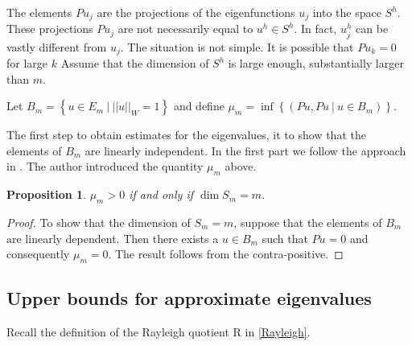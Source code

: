 \documentclass[../../main.tex]{subfiles}
\begin{document}
The elements $Pu_j$ are the projections of the eigenfunctions $u_j$ into the space $S^h$. These projections $Pu_j$ are not necessarily equal to $u^h \in S^h$. In fact, $u^h_j$  can be vastly different from $u_j$. The situation is not simple. It is possible that $Pu_k = 0$ for large $k$ Assume that the dimension of $S^h$ is large enough, substantially larger than $m$.

Let $B_m = \left\{u \in E_m \ | \ ||u||_{W} = 1 \right\}$ and define $\mu_m = \inf\left\{(Pu,Pu \ | \ u \in B_m)\right\}$.

The first step to obtain estimates for the eigenvalues, it to show that the elements of $B_m$ are linearly independent. In the first part we follow the approach in \cite{Zie2000}. The author introduced the quantity $\mu_m$ above.

\newtheorem{Prop_1}{Proposition}
\begin{Prop_1}
 $\mu_{m} > 0$ if and only if $\dim S_{m} = m$. \label{sym:mu}
\end{Prop_1}
\begin{proof}
	To show that the dimension of $S_m = m$, suppose that the elements of $B_m$ are linearly dependent. Then there exists a $u \in B_m$ such that $Pu = 0$ and consequently $\mu_m = 0$. The result follows from the contra-positive.
\end{proof}

\subsection{Upper bounds for approximate eigenvalues}

 Recall the definition of the Rayleigh quotient R in \eqref{Rayleigh}.
\end{document}
